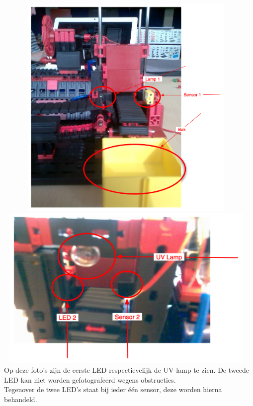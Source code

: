   \includegraphics[width=13cm, height=11cm]{lamp} \\
  \includegraphics[width=13cm, height=8cm]{UVlamp} \\

Op deze foto's zijn de eerste LED respectievelijk de UV-lamp te zien. 
De tweede LED kan niet worden gefotografeerd wegens obstructies. \\
Tegenover de twee LED's staat bij ieder \'e\'en sensor, deze worden hierna behandeld.



